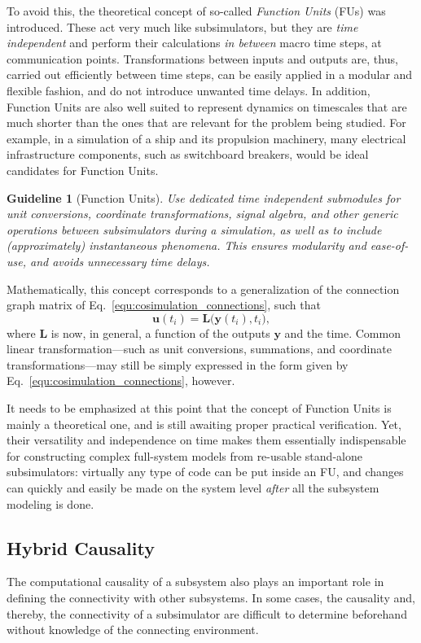 \documentclass[prb,aps,showpacs,floatfix,twocolumn,10pt]{revtex4-1}
\newcommand{\vect}[1]{\bm{#1}}
\newcommand{\sub}{subsimulator}
\newcommand{\guidelineFUs}{%
	Use dedicated time independent submodules for unit conversions, coordinate transformations, signal algebra, and other generic operations between \sub{}s during a simulation, as well as to include (approximately) instantaneous phenomena.
	This ensures modularity and ease-of-use, and avoids unnecessary time delays.
}
\theoremstyle{plain}
\newtheorem{guideline}{Guideline}
\theoremstyle{remark}
\begin{document}
To avoid this, the theoretical concept of so-called \emph{Function Units} (FUs) was introduced.
These act very much like \sub{}s, but they are \emph{time independent} and perform their calculations \emph{in between} macro time steps, at communication points.
Transformations between inputs and outputs are, thus, carried out efficiently between time steps, can be easily applied in a modular and flexible fashion, and do not introduce unwanted time delays.
In addition, Function Units are also well suited to represent dynamics on timescales that are much shorter than the ones that are relevant for the problem being studied.
For example, in a simulation of a ship and its propulsion machinery, many electrical infrastructure components, such as switchboard breakers, would be ideal candidates for Function Units.

\begin{guideline}[Function Units]
\label{guideline:FUs}
	\guidelineFUs{}
\end{guideline}

Mathematically, this concept corresponds to a generalization of the connection graph matrix of Eq.~\eqref{equ:cosimulation_connections}, such that
\begin{equation}
\label{equ:connectiongraph_general}
	\vect{u}(t_i)
	=
	\vect{L}
	\big(
		\vect{y}(t_i)
		,
		t_i
	\big)
	,
\end{equation}
where $\vect{L}$ is now, in general, a function of the outputs $\vect{y}$ and the time.
Common linear transformation---such as unit conversions, summations, and coordinate transformations---may still be simply expressed in the form given by Eq.~\eqref{equ:cosimulation_connections}, however.

It needs to be emphasized at this point that the concept of Function Units is mainly a theoretical one, and is still awaiting proper practical verification.
Yet, their versatility and independence on time makes them essentially indispensable for constructing complex full-system models from re-usable stand-alone \sub{}s:
virtually any type of code can be put inside an FU, and changes can quickly and easily be made on the system level \emph{after} all the subsystem modeling is done.


\subsection{Hybrid Causality}
\label{subsec:construction:hybrid_causality}

The computational causality of a subsystem also plays an important role in defining the connectivity with other subsystems.
In some cases, the causality and, thereby, the connectivity of a \sub{} are difficult to determine beforehand without knowledge of the connecting environment.
\end{document}
